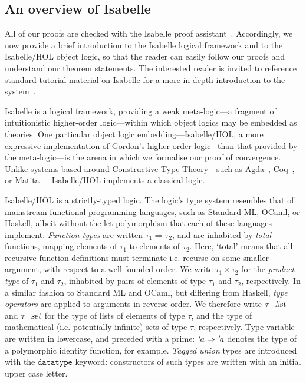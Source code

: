 \documentclass[acmlarge,review,anonymous]{acmart}\settopmatter{printfolios=true}
\begin{document}



\subsection{An overview of Isabelle}
\label{subsect.an.overview.of.isabelle}

All of our proofs are checked with the Isabelle proof assistant~\cite{DBLP:conf/tphol/WenzelPN08}.
Accordingly, we now provide a brief introduction to the Isabelle logical framework and to the Isabelle/HOL object logic, so that the reader can easily follow our proofs and understand our theorem statements.
The interested reader is invited to reference standard tutorial material on Isabelle for a more in-depth introduction to the system~\cite{DBLP:books/sp/NipkowK14}.

Isabelle is a logical framework, providing a weak meta-logic---a fragment of intuitionistic higher-order logic---within which object logics may be embedded as theories.
One particular object logic embedding---Isabelle/HOL, a more expressive implementation of Gordon's higher-order logic~\cite{DBLP:conf/tphol/Gordon91} than that provided by the meta-logic---is the arena in which we formalise our proof of convergence.
Unlike systems based around Constructive Type Theory---such as Agda~\cite{DBLP:conf/tphol/BoveDN09}, Coq~\cite{DBLP:conf/popl/HuetH14}, or Matita~\cite{DBLP:conf/cade/AspertiRCT11}---Isabelle/HOL implements a classical logic.


Isabelle/HOL is a strictly-typed logic.
The logic's type system resembles that of mainstream functional programming languages, such as Standard ML, OCaml, or Haskell, albeit without the let-polymorphism that each of these languages implement.
\emph{Function types} are written $\tau_1 \Rightarrow \tau_2$, and are inhabited by \emph{total} functions, mapping elements of $\tau_1$ to elements of $\tau_2$.
Here, `total' means that all recursive function definitions must terminate i.e. recurse on some smaller argument, with respect to a well-founded order.
We write $\tau_1 \times \tau_2$ for the \emph{product type} of $\tau_1$ and $\tau_2$, inhabited by pairs of elements of type $\tau_1$ and $\tau_2$, respectively.
In a similar fashion to Standard ML and OCaml, but differing from Haskell, \emph{type operators} are applied to arguments in reverse order.
We therefore write $\tau\ \isa{list}$ and $\tau\ \isa{set}$ for the type of lists of elements of type $\tau$, and the type of mathematical (i.e. potentially infinite) sets of type $\tau$, respectively.
Type variable are written in lowercase, and preceded with a prime: ${\emph{$\mskip2mu{'}\mskip-2mu$}}a \Rightarrow {\emph{$\mskip2mu{'}\mskip-2mu$}}a$ denotes the type of a polymorphic identity function, for example.
\emph{Tagged union} types are introduced with the $\mathtt{datatype}$ keyword: constructors of such types are written with an initial upper case letter.
\end{document}
